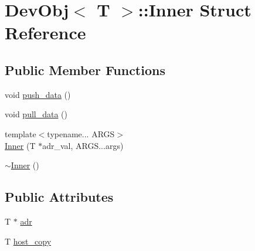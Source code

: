 \hypertarget{structDevObj_1_1Inner}{\section{Dev\-Obj$<$ T $>$\-:\-:Inner Struct Reference}
\label{structDevObj_1_1Inner}
}
\subsection*{Public Member Functions}
\begin{DoxyCompactItemize}
\item 
void \hyperlink{structDevObj_1_1Inner_a9e57ef38c358408fa884e3da01737138}{push\-\_\-data} ()
\item 
void \hyperlink{structDevObj_1_1Inner_acc7f57303723654f0993611f0ec9ef57}{pull\-\_\-data} ()
\item 
{\footnotesize template$<$typename... A\-R\-G\-S$>$ }\\\hyperlink{structDevObj_1_1Inner_a954a929a667fa91218e6e56b6168d5f6}{Inner} (T $\ast$adr\-\_\-val, A\-R\-G\-S...\-args)
\item 
\hyperlink{structDevObj_1_1Inner_a5704b33a4db1d7686adfc1cefac33138}{$\sim$\-Inner} ()
\end{DoxyCompactItemize}
\subsection*{Public Attributes}
\begin{DoxyCompactItemize}
\item 
T $\ast$ \hyperlink{structDevObj_1_1Inner_a89ee00dc33d7d539522cadb1647b9cf0}{adr}
\item 
T \hyperlink{structDevObj_1_1Inner_a11705dd078bbde24f4a733d1db93bebe}{host\-\_\-copy}
\end{DoxyCompactItemize}


